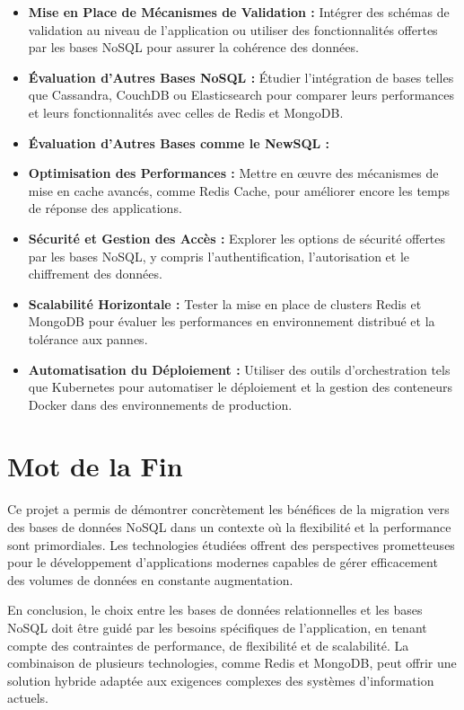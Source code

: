 \begin{itemize}
  \item \textbf{Mise en Place de Mécanismes de Validation :} Intégrer des schémas de validation au niveau de l'application ou utiliser des fonctionnalités offertes par les bases NoSQL pour assurer la cohérence des données.

  \item \textbf{Évaluation d'Autres Bases NoSQL :} Étudier l'intégration de bases telles que Cassandra, CouchDB ou Elasticsearch pour comparer leurs performances et leurs fonctionnalités avec celles de Redis et MongoDB.
  
  \item \textbf{Évaluation d'Autres Bases comme le NewSQL :} 

  \item \textbf{Optimisation des Performances :} Mettre en œuvre des mécanismes de mise en cache avancés, comme Redis Cache, pour améliorer encore les temps de réponse des applications.

  \item \textbf{Sécurité et Gestion des Accès :} Explorer les options de sécurité offertes par les bases NoSQL, y compris l'authentification, l'autorisation et le chiffrement des données.

  \item \textbf{Scalabilité Horizontale :} Tester la mise en place de clusters Redis et MongoDB pour évaluer les performances en environnement distribué et la tolérance aux pannes.

  \item \textbf{Automatisation du Déploiement :} Utiliser des outils d'orchestration tels que Kubernetes pour automatiser le déploiement et la gestion des conteneurs Docker dans des environnements de production.

\end{itemize}

\section*{Mot de la Fin}

Ce projet a permis de démontrer concrètement les bénéfices de la migration vers des bases de données NoSQL dans un contexte où la flexibilité et la performance sont primordiales. Les technologies étudiées offrent des perspectives prometteuses pour le développement d'applications modernes capables de gérer efficacement des volumes de données en constante augmentation.

En conclusion, le choix entre les bases de données relationnelles et les bases NoSQL doit être guidé par les besoins spécifiques de l'application, en tenant compte des contraintes de performance, de flexibilité et de scalabilité. La combinaison de plusieurs technologies, comme Redis et MongoDB, peut offrir une solution hybride adaptée aux exigences complexes des systèmes d'information actuels.


